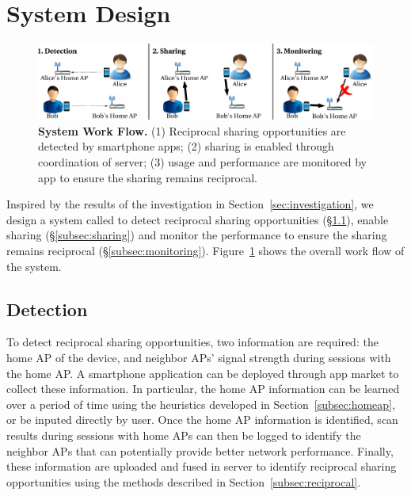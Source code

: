 \section{System Design}
\label{sec:design}

\begin{figure}[t]
  \centering
  \includegraphics[width=\textwidth]{./figures/design.pdf}
  \caption{\textbf{\wisefi{} System Work Flow.} (1) Reciprocal sharing
    opportunities are detected by \wisefi{} smartphone apps; (2) \wifi{} sharing
    is enabled through coordination of \wisefi{} server; (3) \wifi{} usage and
    performance are monitored by \wisefi{} app to ensure the sharing remains
  reciprocal.}
  \label{fig:design}
\end{figure}

Inspired by the results of the investigation in Section~\ref{sec:investigation},
we design a system called \wisefi{} to detect reciprocal sharing
opportunities (\S\ref{subsec:detection}), enable \wifi{} sharing
(\S\ref{subsec:sharing}) and monitor the \wifi{} performance to ensure the
sharing remains reciprocal (\S\ref{subsec:monitoring}). Figure~\ref{fig:design}
shows the overall work flow of the \wisefi{} system.

\subsection{Detection}
\label{subsec:detection}

To detect reciprocal sharing opportunities, two information are required: the
home AP of the device, and neighbor APs' signal strength during \wifi{} sessions
with the home AP. A smartphone application can be deployed through app market to
collect these information. In particular, the home AP information can be learned
over a period of time using the heuristics developed in
Section~\ref{subsec:homeap}, or be inputed directly by user. Once the home AP
information is identified, \wifi{} scan results during sessions with home APs
can then be logged to identify the neighbor APs that can potentially provide
better network performance. Finally, these information are uploaded and fused in
\wisefi{} server to identify reciprocal sharing opportunities using the methods
described in Section~\ref{subsec:reciprocal}.

